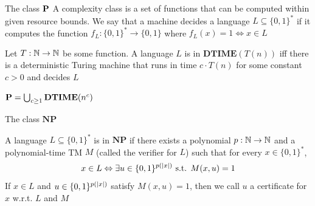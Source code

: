 \documentclass[presentation]{beamer}
\def \NP {\textbf{NP}}
\def \DTIME {\textbf{DTIME}}
\def \NP {\textbf{NP}}
\begin{document}
\begin{frame}[label={sec:org7a1fb76}]{The class \texorpdfstring{\(\operatorname{\textbf{P}}\)}{P}}
A \alert{complexity class} is a set of functions that can be computed within given resource bounds. We
say that a machine \alert{decides} a language \(L\subseteq\{0,1\}^*\) if it computes the
function \(f_L:\{0,1\}^*\to\{0,1\}\) where \(f_L(x)=1\Leftrightarrow x\in L\)

\begin{definition}[]
Let \(T:\mathbb{N}\to\mathbb{N}\) be some function. A language \(L\) is in \(\DTIME(T(n))\) iff there is a
deterministic Turing machine that runs in time \(c\cdot T(n)\) for some constant \(c>0\) and decides \(L\)
\end{definition}

\begin{definition}[]
\(\bP=\bigcup_{c\ge 1}\DTIME(n^c)\)
\end{definition}
\end{frame}
\begin{frame}[label={sec:org67ccad3}]{The class \texorpdfstring{\(\NP\)}{NP}}
\begin{definition}[]
A language \(L\subseteq\{0,1\}^*\) is in \(\NP\) if there exists a polynomial \(p:\mathbb{N}\to\mathbb{N}\) and a
polynomial-time TM \(M\) (called the \alert{verifier} for \(L\)) such that for every \(x\in\{0,1\}^*\),
\begin{equation*}
x\in L\Leftrightarrow\exists u\in\{0,1\}^{p(\abs{x})} \text{ s.t. } M(x,u)=1
\end{equation*}
If \(x\in L\) and \(u\in\{0,1\}^{p(\abs{x})}\) satisfy \(M(x,u)=1\), then we call \(u\) a \alert{certificate}
for \(x\) w.r.t. \(L\) and \(M\)
\end{definition}
\end{frame}
\end{document}
